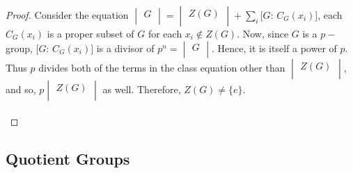 \documentclass[11pt,a4paper]{article}
\theoremstyle{definition}
\begin{document}
\begin{proof}
Consider the equation $\begin{vmatrix}
G\\
\end{vmatrix} = \begin{vmatrix}
Z(G)\\
\end{vmatrix} + \sum\limits_i\big[G:\, C_G(x_i)\big]$, each $C_G(x_i)$ is a proper subset of $G$ for each $x_i\not\in Z(G)$. Now, since $G$ is a $p-$group, $\big[G:\, C_G(x_i)\big]$ is a divisor of $p^n = \begin{vmatrix}
G\\
\end{vmatrix}$. Hence, it is itself a power of $p$. Thus $p$ divides both of the terms in the class equation other than $\begin{vmatrix}
Z(G)\\
\end{vmatrix}$, and so, $p\begin{vmatrix}
Z(G)\\
\end{vmatrix}$ as well. Therefore, $Z(G)\neq \{e\}$.\\\\
\end{proof}

 
 
 
 


\subsection{Quotient Groups} 
\end{document}
